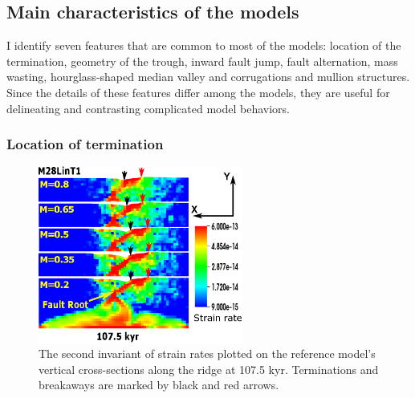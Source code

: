 \subsection{Main characteristics of the models}
I identify seven features that are common to most of the models: location of the termination, geometry of the trough, inward fault jump, fault alternation, mass wasting, hourglass-shaped median valley and corrugations and mullion structures. Since the details of these features differ among the models, they are useful for delineating and contrasting complicated model behaviors.

\subsubsection{Location of termination}

\begin{figure}[h]
  \centering
    \includegraphics[width=0.6\textwidth]{./Figures/fig_Results1_2.eps}
  \caption{The second invariant of strain rates plotted on the reference model's vertical cross-sections along the ridge at 107.5 kyr. Terminations and breakaways are marked by black and red arrows.}
 \label{fig_Results1_2}
\end{figure}   

